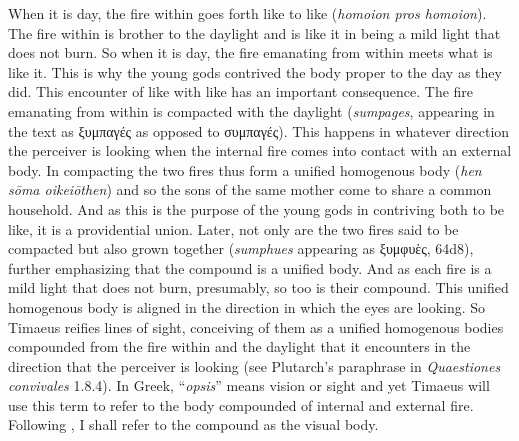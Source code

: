 When it is day, the fire within goes forth like to like (\emph{homoion pros homoion}). The fire within is brother to the daylight and is like it in being a mild light that does not burn. So when it is day, the fire emanating from within meets what is like it. This is why the young gods contrived the body proper to the day as they did. This encounter of like with like has an important consequence. The fire emanating from within is compacted with the daylight (\emph{sumpages}, appearing in the text as {\sbl ξυμπαγές} as opposed to {\sbl συμπαγές}). This happens in whatever direction the perceiver is looking when the internal fire comes into contact with an external body. In compacting the two fires thus form a unified homogenous body (\emph{hen sōma oikeiōthen}) and so the sons of the same mother come to share a common household. And as this is the purpose of the young gods in contriving both to be like, it is a providential union. Later, not only are the two fires said to be compacted but also grown together (\emph{sumphues} appearing as {\sbl ξυμφυὲς}, 64d8), further emphasizing that the compound is a unified body. And as each fire is a mild light that does not burn, presumably, so too is their compound. This unified homogenous body is aligned in the direction in which the eyes are looking. So Timaeus reifies lines of sight, conceiving of them as a unified homogenous bodies compounded from the fire within and the daylight that it encounters in the direction that the perceiver is looking (see Plutarch's paraphrase in \emph{Quaestiones convivales} 1.8.4). In Greek, ``\emph{opsis}'' means vision or sight and yet Timaeus will use this term to refer to the body compounded of internal and external fire. Following \citet[221]{Ierodiakonou:2005ly}, I shall refer to the compound as the visual body.

